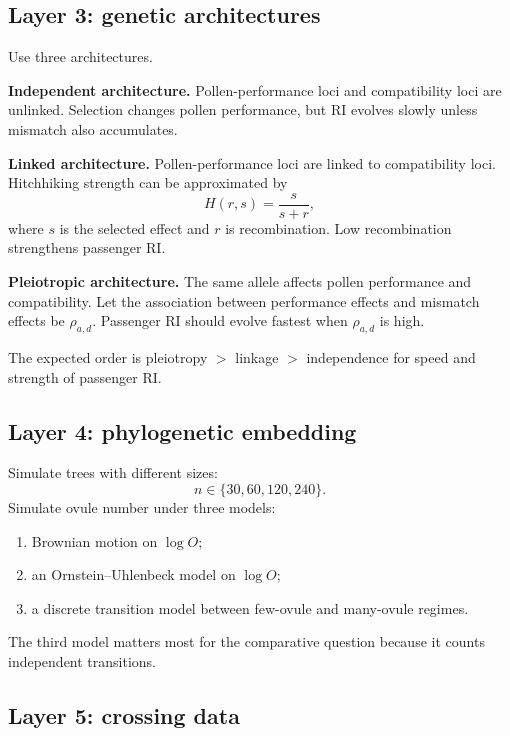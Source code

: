 \documentclass[12pt]{article}
\begin{document}
\subsection{Layer 3: genetic architectures}

Use three architectures.

\textbf{Independent architecture.} Pollen-performance loci and compatibility loci are unlinked. Selection changes pollen performance, but RI evolves slowly unless mismatch also accumulates.

\textbf{Linked architecture.} Pollen-performance loci are linked to compatibility loci. Hitchhiking strength can be approximated by
\begin{equation}
H(r,s)=\frac{s}{s+r},
\end{equation}
where $s$ is the selected effect and $r$ is recombination. Low recombination strengthens passenger RI.

\textbf{Pleiotropic architecture.} The same allele affects pollen performance and compatibility. Let the association between performance effects and mismatch effects be $\rho_{a,d}$. Passenger RI should evolve fastest when $\rho_{a,d}$ is high.

\begin{conclusionbox}
The expected order is pleiotropy $>$ linkage $>$ independence for speed and strength of passenger RI.
\end{conclusionbox}

\subsection{Layer 4: phylogenetic embedding}

Simulate trees with different sizes:
\begin{equation}
n\in\{30,60,120,240\}.
\end{equation}
Simulate ovule number under three models:
\begin{enumerate}
\item Brownian motion on $\log O$;
\item an Ornstein--Uhlenbeck model on $\log O$;
\item a discrete transition model between few-ovule and many-ovule regimes.
\end{enumerate}

The third model matters most for the comparative question because it counts independent transitions.

\subsection{Layer 5: crossing data}
\end{document}
